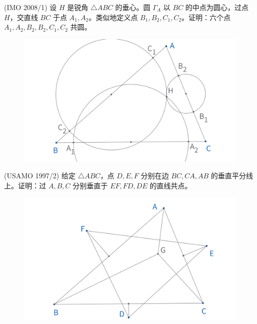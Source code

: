 \newpage 
\begin{exercise}
    (IMO 2008/1) 设 $H$ 是锐角 $\triangle ABC$ 的垂心。圆 $\Gamma_A$ 以 ${BC}$ 的中点为圆心，过点 $H$，交直线 ${BC}$ 于点 $A_1, A_2$。类似地定义点 $B_1, B_2, C_1, C_2$。证明：六个点 $A_1, A_2, B_2, B_2, C_1, C_2$ 共圆。
\end{exercise}
\begin{figure}[H]
    \centering
    \includegraphics[width=0.7\linewidth]{figures/exercises/229.png}
\end{figure}


\begin{exercise}
    (USAMO 1997/2) 给定 $\triangle ABC$，点 $D, E, F$ 分别在边 ${BC}, {CA}, {AB}$ 的垂直平分线上。证明：过 $A, B, C$ 分别垂直于 ${EF}, {FD}, {DE}$ 的直线共点。
\end{exercise}
\begin{figure}[H]
    \centering
    \includegraphics[width=0.7\linewidth]{figures/exercises/230.png}
\end{figure}

